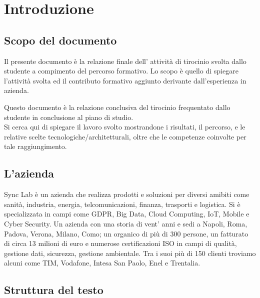 
\chapter{Introduzione}
\label{cap:introduzione}

\section{Scopo del documento}

Il presente documento è la relazione finale dell’ attività di tirocinio
svolta dallo studente a compimento del percorso formativo.
Lo scopo è quello di spiegare l’attività svolta ed il
contributo formativo aggiunto derivante dall’esperienza in azienda.

Questo documento è la relazione conclusiva del tirocinio frequentato dallo
studente in conclusione al piano di studio. \\
Si cerca qui di spiegare il lavoro svolto mostrandone i risultati, il percorso, 
e le relative scelte tecnologiche/architetturali, oltre che le competenze
coinvolte per tale raggiungimento.

\section{L'azienda}
Sync Lab è un azienda che realizza prodotti e soluzioni per diversi amibiti come
sanità, industria, energia, telcomunicazioni, finanza, trasporti e logistica.
Si è specializzata in campi come GDPR, Big Data, Cloud Computing, IoT, Mobile e Cyber Security.
Un azienda con una storia di vent' anni e sedi a Napoli, Roma, Padova, Verona, Milano, Como;
un organico di più di 300 persone, un fatturato di circa 13 milioni di euro e numerose certificazioni
ISO in campi di qualità, gestione dati, sicurezza, gestione ambientale.
Tra i suoi più di 150 clienti troviamo alcuni come TIM, Vodafone, Intesa San Paolo, Enel e Trentalia.

\section{Struttura del testo}


